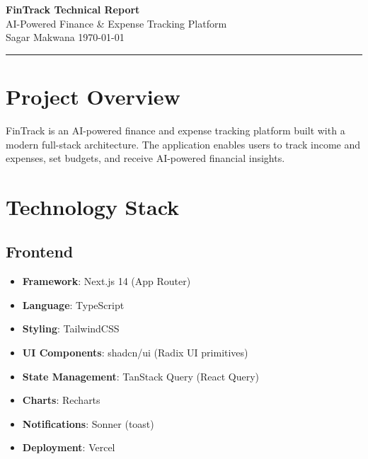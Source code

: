 \documentclass[11pt,a4paper]{article}
\begin{document}
\begin{center}
  {\Huge\bfseries FinTrack Technical Report}\\[0.4em]
  {\large\color{secondary} AI-Powered Finance \& Expense Tracking Platform}\\[0.3em]
  {\small Sagar Makwana \quad\textbar\quad \today}
\end{center}
\vspace{0.5em}
\hrule
\vspace{1em}

\section{Project Overview}

FinTrack is an AI-powered finance and expense tracking platform built with a modern full-stack architecture. The application enables users to track income and expenses, set budgets, and receive AI-powered financial insights.

\section{Technology Stack}

\subsection{Frontend}
\begin{itemize}[leftmargin=*,itemsep=2pt]
  \item \textbf{Framework}: Next.js 14 (App Router)
  \item \textbf{Language}: TypeScript
  \item \textbf{Styling}: TailwindCSS
  \item \textbf{UI Components}: shadcn/ui (Radix UI primitives)
  \item \textbf{State Management}: TanStack Query (React Query)
  \item \textbf{Charts}: Recharts
  \item \textbf{Notifications}: Sonner (toast)
  \item \textbf{Deployment}: Vercel
\end{itemize}
\end{document}
